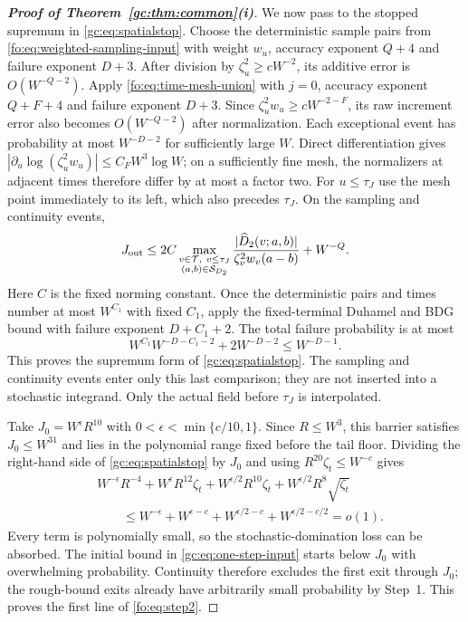 \documentclass[11pt]{article}
\numberwithin{equation}{section}
\theoremstyle{remark}
\begin{document}
\begin{proof}[\textbf{Proof of Theorem~\ref{gc:thm:common}(i)}]
We now pass to the stopped supremum in \eqref{gc:eq:spatialstop}.
Choose the deterministic sample pairs from \eqref{fo:eq:weighted-sampling-input} with weight
$w_u$, accuracy exponent $Q+4$ and failure exponent $D+3$.
After division by $\zeta_u^2\ge cW^{-2}$, its additive error is
$O(W^{-Q-2})$. Apply \eqref{fo:eq:time-mesh-union} with $j=0$,
accuracy exponent $Q+F+4$ and failure exponent $D+3$.
Since $\zeta_u^2w_u\ge cW^{-2-F}$, its raw increment error also
becomes $O(W^{-Q-2})$ after normalization. Each exceptional event
has probability at most $W^{-D-2}$ for sufficiently large $W$.
Direct differentiation gives
$|\partial_u\log(\zeta_u^2w_u)|\le C_FW^3\log W$; on a sufficiently
fine mesh, the normalizers at adjacent times therefore differ by at most a factor two.
For $u\le\tau_J$ use the mesh point immediately to its left, which
also precedes $\tau_J$. On the sampling and continuity events,
\begin{equation}\label{fo:eq:stopped-sampling}
 J_{\rm out}\le
 2C\max_{\substack{v\in\mathcal T,\ v\le\tau_J\\
                         (a,b)\in\mathcal S_{D_2}}}
 \frac{|\widehat D_2(v;a,b)|}{\zeta_v^2w_v(a-b)}+W^{-Q}.
\end{equation}
Here $C$ is the fixed norming constant. Once the deterministic
pairs and times number at most $W^{C_1}$ with fixed $C_1$, apply the
fixed-terminal Duhamel and BDG bound with failure exponent $D+C_1+2$.
The total failure probability is at most
\[
 W^{C_1}W^{-D-C_1-2}+2W^{-D-2}\le W^{-D-1}.
\]
This proves the supremum form of \eqref{gc:eq:spatialstop}. The
sampling and continuity events enter only this last comparison; they
are not inserted into a stochastic integrand. Only the actual field
before $\tau_J$ is interpolated.

Take $J_0=W^\epsilon R^{10}$ with $0<\epsilon<\min\{c/10,1\}$.
Since $R\le W^3$, this barrier satisfies $J_0\le W^{31}$ and lies
in the polynomial range fixed before the tail floor.
Dividing the right-hand side of \eqref{gc:eq:spatialstop} by $J_0$
and using $R^{20}\zeta_t\le W^{-c}$ gives
\[
 \begin{aligned}
 &W^{-\epsilon}R^{-4}+W^\epsilon R^{12}\zeta_t
   +W^{\epsilon/2}R^{10}\zeta_t
   +W^{\epsilon/2}R^8\sqrt{\zeta_t}\\
 &\qquad\le W^{-\epsilon}+W^{\epsilon-c}
       +W^{\epsilon/2-c}+W^{\epsilon/2-c/2}=o(1).
 \end{aligned}
\]
Every term is polynomially small, so the stochastic-domination loss
can be absorbed. The initial bound in \eqref{gc:eq:one-step-input}
starts below $J_0$ with overwhelming probability. Continuity therefore
excludes the first exit through $J_0$; the rough-bound exits already
have arbitrarily small probability by Step~1. This proves the first
line of \eqref{fo:eq:step2}.


\end{proof}
\end{document}
